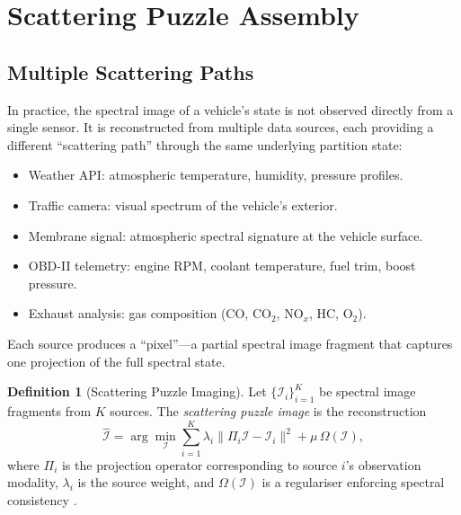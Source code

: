 \documentclass[11pt,twocolumn,a4paper]{article}
\theoremstyle{definition}
\newtheorem{definition}[theorem]{Definition}
\theoremstyle{remark}
\begin{document}
\section{Scattering Puzzle Assembly}\label{sec:scattering-puzzle}

\subsection{Multiple Scattering Paths}

In practice, the spectral image of a vehicle's state is not observed directly from a single sensor.  It is reconstructed from multiple data sources, each providing a different ``scattering path'' through the same underlying partition state:
\begin{itemize}
    \item Weather API: atmospheric temperature, humidity, pressure profiles.
    \item Traffic camera: visual spectrum of the vehicle's exterior.
    \item Membrane signal: atmospheric spectral signature at the vehicle surface.
    \item OBD-II telemetry: engine RPM, coolant temperature, fuel trim, boost pressure.
    \item Exhaust analysis: gas composition (CO, CO$_2$, NO$_x$, HC, O$_2$).
\end{itemize}

Each source produces a ``pixel''---a partial spectral image fragment that captures one projection of the full spectral state.

\begin{definition}[Scattering Puzzle Imaging]\label{def:scattering-puzzle}
Let $\{\mathcal{I}_i\}_{i=1}^K$ be spectral image fragments from $K$ sources.  The \emph{scattering puzzle image} is the reconstruction
\begin{equation}\label{eq:scattering-puzzle}
    \hat{\mathcal{I}} = \arg\min_{\mathcal{I}} \sum_{i=1}^{K} \lambda_i \|\Pi_i \mathcal{I} - \mathcal{I}_i\|^2 + \mu \, \Omega(\mathcal{I}),
\end{equation}
where $\Pi_i$ is the projection operator corresponding to source $i$'s observation modality, $\lambda_i$ is the source weight, and $\Omega(\mathcal{I})$ is a regulariser enforcing spectral consistency \citep{sachikonye2026scattering}.
\end{definition}
\end{document}
